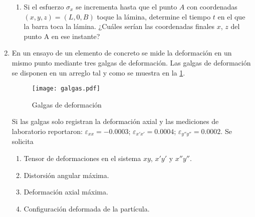 \documentclass[../notas medios.tex]{subfiles}
\begin{document}
\begin{enumerate}
\begin{enumerate}
\item Si el esfuerzo  $\sigma_x$ se incrementa  hasta que el punto  $A$ con 
coordenadas  $(x,y,z) = (L, 0, B)$ toque la lámina, determine el tiempo $t$  en 
el que la barra toca la lámina. ¿Cuáles serían las coordenadas finales $x$, $z$ 
del punto A en ese instante?
\end{enumerate}


\item  \label{punto13_d}  En un ensayo de un elemento de concreto se mide la 
deformación en un mismo punto mediante tres galgas de deformación. Las galgas 
de deformación se disponen en un arreglo tal y como se muestra en la 
\cref{ensayogalga}.
\begin{figure}[H]
	\centering
	\texttt{[image: galgas.pdf]}
	\caption{Galgas de deformación}
	\label{ensayogalga}
\end{figure}


Si las galgas solo registran la deformación axial y las mediciones de laboratorio reportaron: $\varepsilon_{xx} = -0.0003$; $\varepsilon_{x'x'} = 0.0004$; $\varepsilon_{y''y''} = 0.0002$. Se solicita

\begin{enumerate}
\item Tensor de deformaciones en el sistema $xy$, $x'y'$ y $x''y''$. 

\item Distorsión angular máxima. 

\item Deformación axial máxima.

\item Configuración deformada de la partícula.
\end{enumerate}

\end{enumerate}
\end{document}
